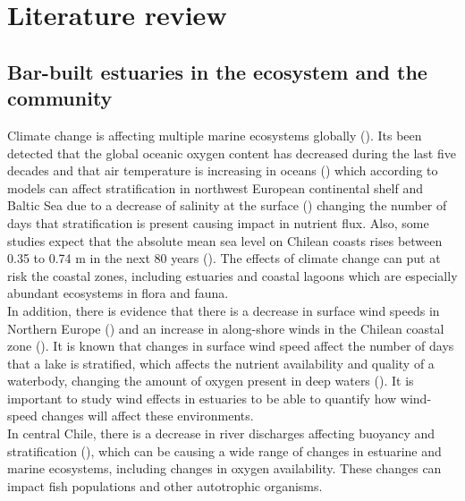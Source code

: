\documentclass[11pt,letterpaper]{article}
\begin{document}
\section{Literature review}

\subsection{Bar-built estuaries in the ecosystem and the community}

Climate change is affecting multiple marine ecosystems globally (\cite{hewitt2016multiple}). Its been detected that the global oceanic oxygen content has decreased during the last five decades \cite{schmidtko2017decline} and that air temperature is increasing in oceans (\cite{omstedt2004baltic, jones1999surface}) which according to models can affect stratification in northwest European continental shelf and Baltic Sea due to a decrease of salinity at the surface (\cite{hordoir2012effect, holt2010potential}) changing the number of days that stratification is present causing impact in nutrient flux. Also, some studies expect that the absolute mean sea level on Chilean coasts rises between 0.35 to 0.74 m in the next 80 years (\cite{winckler2020evidence}). The effects of climate change can put at risk the coastal zones, including estuaries and coastal lagoons which are especially abundant ecosystems in flora and fauna.\\

In addition, there is evidence that there is a decrease in surface wind speeds in Northern Europe (\cite{woolway2017atmospheric}) and an increase in along-shore winds in the Chilean coastal zone (\cite{winckler2020evidence}). It is known that changes in surface wind speed affect the number of days that a lake is stratified, which affects the nutrient availability and quality of a waterbody, changing the amount of oxygen present in deep waters (\cite{woolway2017atmospheric}). It is important to study wind effects in estuaries to be able to quantify how wind-speed changes will affect these environments.\\

In central Chile, there is a decrease in river discharges affecting buoyancy and stratification (\cite{winckler2020evidence}), which can be causing a wide range of changes in estuarine and marine ecosystems, including changes in oxygen availability. These changes can impact fish populations and other autotrophic organisms.\\
\end{document}
